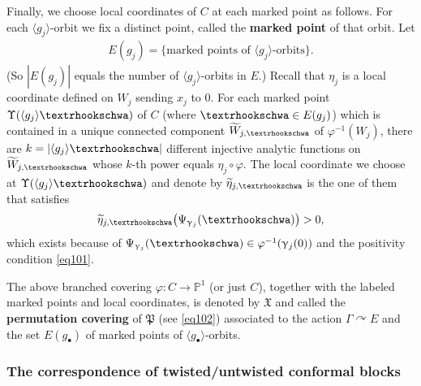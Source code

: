\documentclass[11pt,b5paper,notitlepage]{article}
\theoremstyle{definition}
\theoremstyle{plain}
\newcommand{\fk}{\mathfrak}
\newcommand{\mc}{\mathcal}
\newcommand{\wtd}{\widetilde}
\newcommand{\bk}[1]{\langle {#1}\rangle}
\newcommand{\blt}{\bullet}
\newcommand{\Vbb}{\mathbb V}
\newcommand{\Ubb}{\mathbb U}
\newcommand{\Cbb}{\mathbb C}
\newcommand{\Pbb}{\mathbb P}
\newcommand{\tipae}{\text{\textrhookschwa}}
\numberwithin{equation}{subsection}
\begin{document}
Finally, we choose local coordinates of $C$ at each marked point as follows. For each $\bk{g_j}$-orbit we fix a distinct point, called the \textbf{marked point} of that orbit. Let 
\begin{align*}
	E(g_j)=\{\text{marked points of $\bk{g_j}$-orbits}\}.
\end{align*}
(So $|E(g_j)|$ equals the number of $\bk{g_j}$-orbits in $E$.) Recall that $\eta_j$ is a local coordinate defined on $W_j$ sending $x_j$ to $0$. For each marked point $\Upsilon(\bk{g_j}\tipae)$ of $C$ (where $\tipae\in E(g_j)$) which is contained in a unique connected component $\wtd W_{j,\tipae}$ of $\varphi^{-1}(W_j)$, there are $k=|\bk{g_j}\tipae|$ different injective analytic functions on $\wtd W_{j,\tipae}$ whose $k$-th power equals $\eta_j\circ\varphi$. The local coordinate we choose at $\Upsilon(\bk{g_j}\tipae)$ and denote by $\wtd\eta_{j,\tipae}$ is the one of them that satisfies
\begin{align*}
\wtd\eta_{j,\tipae}\big(\Psi_{\upgamma_j}(\tipae)\big)>0,	
\end{align*}
which exists because of $\Psi_{\upgamma_j}(\tipae)\in\varphi^{-1}(\upgamma_j(0))$ and the positivity condition \eqref{eq101}.

The above branched covering $\varphi:C\rightarrow\Pbb^1$ (or just $C$), together with the labeled marked points and local coordinates, is denoted by $\fk X$ and called the \textbf{permutation covering} of  $\fk P$ (see \eqref{eq102}) associated to the action $\Gamma\curvearrowright E$ and the set $E(g_\blt)$ of marked points of $\bk{g_\blt}$-orbits.



\subsubsection*{The correspondence of twisted/untwisted conformal blocks}



\end{document}
